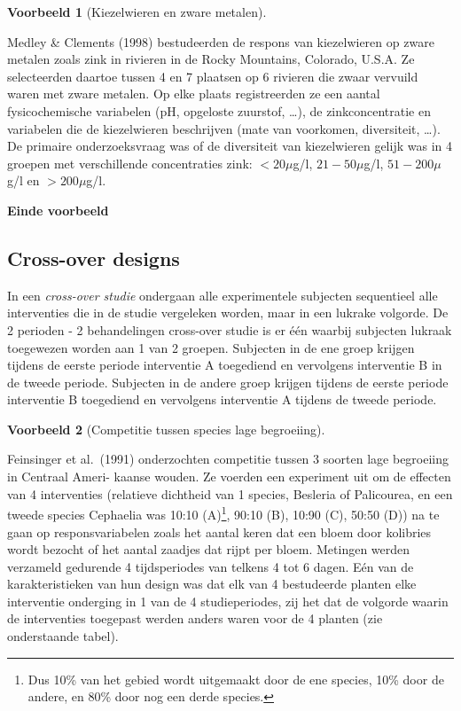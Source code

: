 \documentclass[
  12pt,dutch,coursenotes]{book}
\theoremstyle{definition}
\theoremstyle{definition}
\newtheorem{example}{Voorbeeld}[chapter]
\theoremstyle{definition}
\theoremstyle{remark}
\begin{document}
\begin{example}[Kiezelwieren en zware metalen]
\protect\hypertarget{exm:unnamed-chunk-75}{}{\label{exm:unnamed-chunk-75} \iffalse (Kiezelwieren en zware metalen) \fi{} }
\end{example}

Medley \& Clements (1998) bestudeerden de respons van kiezelwieren
op zware metalen zoals zink in rivieren in de Rocky Mountains, Colorado, U.S.A.
Ze selecteerden daartoe tussen 4 en 7 plaatsen op 6 rivieren die zwaar vervuild
waren met zware metalen. Op elke plaats registreerden ze een aantal fysicochemische
variabelen (pH, opgeloste zuurstof, \ldots), de zinkconcentratie en variabelen die de
kiezelwieren beschrijven (mate van voorkomen, diversiteit, \ldots).
De primaire onderzoeksvraag was of de diversiteit van kiezelwieren gelijk was in
4 groepen met verschillende concentraties zink:
\(<20 \mu\)g/l, \(21-50 \mu\)g/l, \(51-200 \mu\)g/l en \(>200 \mu\)g/l.

\textbf{Einde voorbeeld}

\hypertarget{cross-over-designs}{%
\subsection{Cross-over designs}\label{cross-over-designs}}

In een \emph{cross-over studie} ondergaan alle experimentele subjecten sequentieel alle
interventies die in de studie vergeleken worden, maar in een lukrake
volgorde. De 2 perioden - 2 behandelingen cross-over studie is er één
waarbij subjecten lukraak toegewezen worden aan 1 van 2 groepen.
Subjecten in de ene groep krijgen tijdens de eerste periode interventie A
toegediend en vervolgens interventie B in de tweede periode. Subjecten in
de andere groep krijgen tijdens de eerste periode interventie B toegediend
en vervolgens interventie A tijdens de tweede periode.

\begin{example}[Competitie tussen species lage begroeiing]
\protect\hypertarget{exm:unnamed-chunk-76}{}{\label{exm:unnamed-chunk-76} \iffalse (Competitie tussen species lage begroeiing) \fi{} }
\end{example}

Feinsinger et al.~(1991) onderzochten competitie tussen 3 soorten lage begroeiing in Centraal Ameri- kaanse wouden. Ze voerden een experiment uit om de effecten van 4 interventies (relatieve dichtheid van 1 species, Besleria of Palicourea, en een tweede species Cephaelia was 10:10 (A)\footnote{Dus 10\% van het gebied wordt uitgemaakt door de ene species, 10\% door de andere, en 80\% door nog een derde species.}, 90:10 (B), 10:90 (C), 50:50 (D)) na te gaan op responsvariabelen zoals het aantal keren dat een bloem door kolibries wordt bezocht of het aantal zaadjes dat rijpt per bloem. Metingen werden verzameld gedurende 4 tijdsperiodes van telkens 4 tot 6 dagen. Eén van de karakteristieken van hun design was dat elk van 4 bestudeerde planten elke interventie onderging in 1 van de 4 studieperiodes, zij het dat de volgorde waarin de interventies toegepast werden anders waren voor de 4 planten (zie onderstaande tabel).
\end{document}
